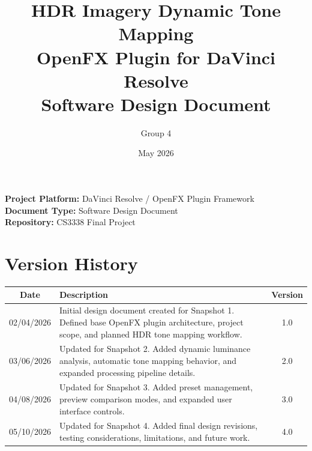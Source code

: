 \documentclass[12pt,hyphens]{article}
\title{HDR Imagery Dynamic Tone Mapping \\ OpenFX Plugin for DaVinci Resolve \\ Software Design Document}
\author{Group 4}
\date{May 2026}
\begin{document}

\begin{titlepage}
\maketitle
\thispagestyle{empty}
\vfill
\begin{center}
\textbf{Project Platform:} DaVinci Resolve / OpenFX Plugin Framework\\
\textbf{Document Type:} Software Design Document\\
\textbf{Repository:} CS3338 Final Project
\end{center}
\end{titlepage}

\thispagestyle{empty}
\tableofcontents
\newpage
{}


\section*{Version History}

\begin{table}[H]
\centering
\renewcommand{\arraystretch}{1.4}
\begin{tabular}{|c|p{9cm}|c|}
    \hline
    \textbf{Date} & \textbf{Description} & \textbf{Version} \\
    \hline
    02/04/2026 & Initial design document created for Snapshot 1. Defined base OpenFX plugin architecture, project scope, and planned HDR tone mapping workflow. & 1.0 \\
    \hline
    03/06/2026 & Updated for Snapshot 2. Added dynamic luminance analysis, automatic tone mapping behavior, and expanded processing pipeline details. & 2.0 \\
    \hline
    04/08/2026 & Updated for Snapshot 3. Added preset management, preview comparison modes, and expanded user interface controls. & 3.0 \\
    \hline
    05/10/2026 & Updated for Snapshot 4. Added final design revisions, testing considerations, limitations, and future work. & 4.0 \\
    \hline
\end{tabular}
\end{table}

\end{document}

